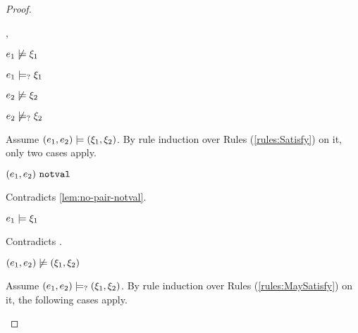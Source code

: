 \begin{proof}
\begin{byCases}
\begin{byCases}
\begin{byCases}
        \item[\cmaysatisfy{e_1}{\xi_1},\cnotsatisfyormay{e_2}{\xi_2}]
            \begin{pfsteps*}
            \item $e_1 \not\models \xi_1$  
            \item $e_1 \models_{?} \xi_1$  
            \item $e_2 \not\models \xi_2$  
            \item $e_2 \not\models_{?} \xi_2$  
            \end{pfsteps*}
            Assume $(e_1 , e_2) \models (\xi_1 , \xi_2)$. By rule induction over Rules (\ref{rules:Satisfy}) on it, only two cases apply. 
           \begin{byCases}
            \item[\text{(\ref{rule:CSNotValPair})}]
                \begin{pfsteps*}
                \item $(e_1 , e_2) ~\mathtt{notval}$ 
                \end{pfsteps*}
                Contradicts \autoref{lem:no-pair-notval}.
            \item[\text{(\ref{rule:CSPair})}]
                \begin{pfsteps*}
                \item $e_1 \models \xi_1$ 
                \end{pfsteps*}
                Contradicts .
            \end{byCases}
            \begin{pfsteps*}
            \item $(e_1 , e_2) \not\models (\xi_1 , \xi_2)$  
            \end{pfsteps*}
            Assume $(e_1 , e_2) \models_{?} (\xi_1 , \xi_2)$. By rule induction over Rules (\ref{rules:MaySatisfy}) on it, the following cases apply.
            \begin{byCases}
            \item[\text{(\ref{rule:CMSNotVal})}]
                \begin{pfsteps*}

\end{pfsteps*}
\end{byCases}
\end{byCases}
\end{byCases}
\end{byCases}
\end{proof}
